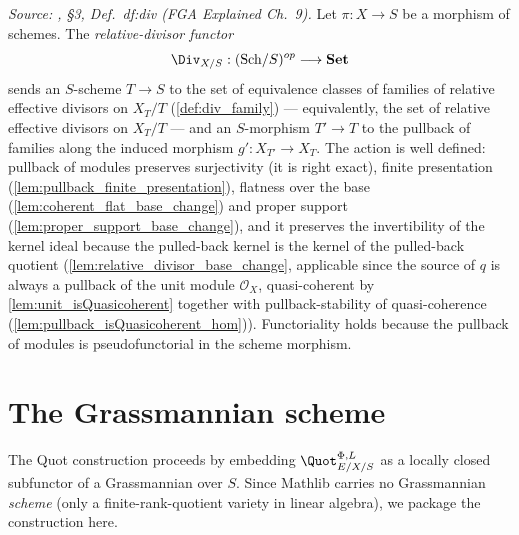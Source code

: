 \begin{definition}\leanok
  \label{def:div_functor}
  \textit{Source: \cite{kleiman-picard}, \S 3, Def.~df:div (FGA Explained Ch.~9).}
  Let \(\pi : X \to S\) be a morphism of schemes.  The
  \emph{relative-divisor functor}
  \[
    \Div_{X/S} : (\mathrm{Sch}/S)^{op} \longrightarrow \mathbf{Set}
  \]
  sends an \(S\)-scheme \(T \to S\) to the set of equivalence classes of
  families of relative effective divisors on \(X_T/T\)
  (\cref{def:div_family}) --- equivalently, the set of relative effective
  divisors on \(X_T/T\) --- and an \(S\)-morphism \(T' \to T\) to the
  pullback of families along the induced morphism
  \(g' : X_{T'} \to X_T\).  The action is well defined: pullback of modules
  preserves surjectivity (it is right exact), finite presentation
  (\cref{lem:pullback_finite_presentation}), flatness over the base
  (\cref{lem:coherent_flat_base_change}) and proper support
  (\cref{lem:proper_support_base_change}), and it preserves the
  invertibility of the kernel ideal because the pulled-back kernel is the
  kernel of the pulled-back quotient (\cref{lem:relative_divisor_base_change},
  applicable since the source of \(q\) is always a pullback of the unit
  module \(\mathcal O_X\), quasi-coherent by \cref{lem:unit_isQuasicoherent}
  together with pullback-stability of quasi-coherence
  (\cref{lem:pullback_isQuasicoherent_hom})).  Functoriality holds because
  the pullback of modules is pseudofunctorial in the scheme morphism.
\end{definition}

\section{The Grassmannian scheme}
\label{sec:grassmannian_scheme}

The Quot construction proceeds by embedding \(\Quot^{\Phi,L}_{E/X/S}\) as a
locally closed subfunctor of a Grassmannian over \(S\). Since Mathlib carries
no Grassmannian \emph{scheme} (only a finite-rank-quotient variety in
linear algebra), we package the construction here.

